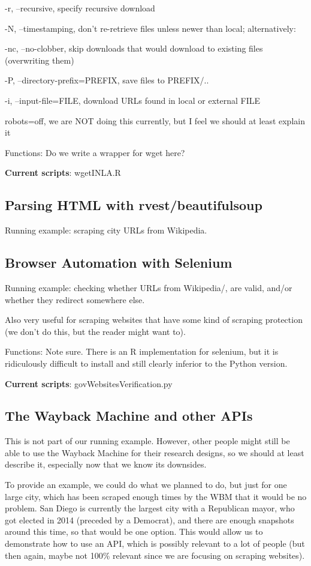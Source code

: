 \documentclass[11pt]{article}
\begin{document}
-r, --recursive, specify recursive download

-N, --timestamping, don't re-retrieve files unless newer than local; alternatively:

-nc, --no-clobber, skip downloads that would download to existing files (overwriting them)

-P,  --directory-prefix=PREFIX, save files to PREFIX/..

-i, --input-file=FILE, download URLs found in local or external FILE

robots=off, we are NOT doing this currently, but I feel we should at least explain it

Functions: Do we write a wrapper for wget here?

\textbf{Current scripts}: wgetINLA.R

\subsection{Parsing HTML with rvest/beautifulsoup} \label{htmlparsing}

Running example: scraping city URLs from Wikipedia.

\subsection{Browser Automation with Selenium} \label{selenium}

Running example: checking whether URLs from Wikipedia/, are valid, and/or whether they redirect somewhere else.

Also very useful for scraping websites that have some kind of scraping protection (we don't do this, but the reader might want to).

Functions: Note sure. There is an R implementation for selenium, but it is ridiculously difficult to install and still clearly inferior to the Python version.

\textbf{Current scripts}: govWebsitesVerification.py

\subsection{The Wayback Machine and other APIs}

This is not part of our running example. However, other people might still be able to use the Wayback Machine for their research designs, so we should at least describe it, especially now that we know its downsides.

To provide an example, we could do what we planned to do, but just for one large city, which has been scraped enough times by the WBM that it would be no problem. San Diego is currently the largest city with a Republican mayor, who got elected in 2014 (preceded by a Democrat), and there are enough snapshots around this time, so that would be one option. This would allow us to demonstrate how to use an API, which is possibly relevant to a lot of people (but then again, maybe not 100\% relevant since we are focusing on scraping websites).
\end{document}
